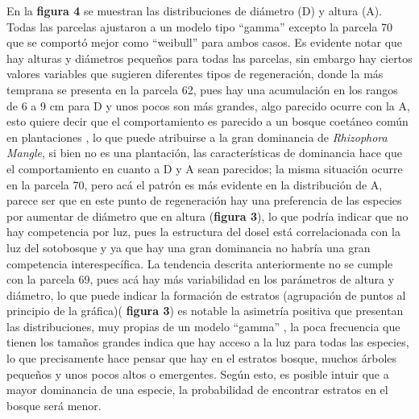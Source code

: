 \documentclass[conference,final,12pt,]{IEEEtran}
\begin{document}
En la \textbf{figura 4} se muestran las distribuciones de diámetro (D) y
altura (A). Todas las parcelas ajustaron a un modelo tipo ``gamma''
excepto la parcela 70 que se comportó mejor como ``weibull'' para ambos
casos. Es evidente notar que hay alturas y diámetros pequeños para todas
las parcelas, sin embargo hay ciertos valores variables que sugieren
diferentes tipos de regeneración, donde la más temprana se presenta en
la parcela 62, pues hay una acumulación en los rangos de 6 a 9 cm para D
y unos pocos son más grandes, algo parecido ocurre con la A, esto quiere
decir que el comportamiento es parecido a un bosque
coetáneo común en plantaciones \citep{AL}, lo que puede atribuirse a la
gran dominancia de \emph{Rhizophora Mangle}, si bien no es una
plantación, las características de dominancia hace que el comportamiento
en cuanto a D y A sean parecidos; la misma situación ocurre en la parcela
70, pero acá el patrón es más evidente en la distribución de A, parece
ser que en este punto de regeneración hay una preferencia de las
especies por aumentar de diámetro que en altura (\textbf{figura 3}), lo
que podría indicar que no hay competencia por luz, pues la estructura
del dosel está correlacionada con la luz del sotobosque \citep{AK} y ya
que hay una gran dominancia no habría una gran competencia
interespecífica. La tendencia descrita anteriormente no se cumple con la
parcela 69, pues acá hay más variabilidad en los parámetros de altura y
diámetro, lo que puede indicar la formación de estratos (agrupación de
puntos al principio de la gráfica)( \textbf{figura 3}) es notable la
asimetría positiva que presentan las distribuciones, muy propias de un
modelo ``gamma'' \citep{AJ}, la poca frecuencia que tienen los tamaños
grandes indica que hay acceso a la luz para todas las especies, lo que
precisamente hace pensar que hay en el estratos bosque, muchos árboles
pequeños y unos pocos altos o emergentes. Según esto, es posible intuir
que a mayor dominancia de una especie, la probabilidad de encontrar
estratos en el bosque será menor.



\end{document}
